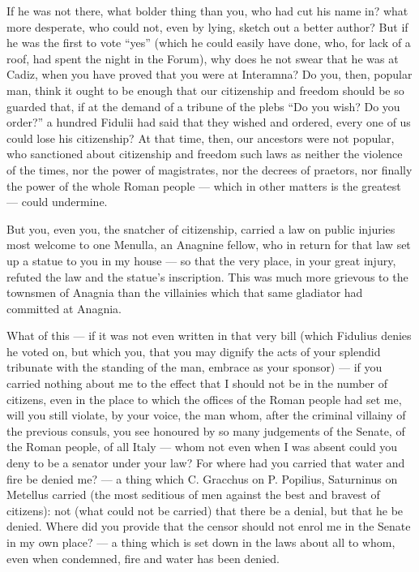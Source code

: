  If he was not there, what bolder thing than you, who had cut his name in? what more desperate, who could not, even by lying, sketch out a better author? But if he was the first to vote ``yes'' (which he could easily have done, who, for lack of a roof, had spent the night in the Forum), why does he not swear that he was at Cadiz, when you have proved that you were at Interamna? Do you, then, popular man, think it ought to be enough that our citizenship and freedom should be so guarded that, if at the demand of a tribune of the plebs ``Do you wish? Do you order?'' a hundred Fidulii had said that they wished and ordered, every one of us could lose his citizenship? At that time, then, our ancestors were not popular, who sanctioned about citizenship and freedom such laws as neither the violence of the times, nor the power of magistrates, nor the decrees of praetors, nor finally the power of the whole Roman people --- which in other matters is the greatest --- could undermine.

 But you, even you, the snatcher of citizenship, carried a law on public injuries most welcome to one Menulla, an Anagnine fellow, who in return for that law set up a statue to you in my house --- so that the very place, in your great injury, refuted the law and the statue's inscription. This was much more grievous to the townsmen of Anagnia than the villainies which that same gladiator had committed at Anagnia.

 What of this --- if it was not even written in that very bill (which Fidulius denies he voted on, but which you, that you may dignify the acts of your splendid tribunate with the standing of the man, embrace as your sponsor) --- if you carried nothing about me to the effect that I should not be in the number of citizens, even in the place to which the offices of the Roman people had set me, will you still violate, by your voice, the man whom, after the criminal villainy of the previous consuls, you see honoured by so many judgements of the Senate, of the Roman people, of all Italy --- whom not even when I was absent could you deny to be a senator under your law? For where had you carried that water and fire be denied me? --- a thing which C. Gracchus on P. Popilius, Saturninus on Metellus carried (the most seditious of men against the best and bravest of citizens): not (what could not be carried) that there be a denial, but that he be denied. Where did you provide that the censor should not enrol me in the Senate in my own place? --- a thing which is set down in the laws about all to whom, even when condemned, fire and water has been denied.

